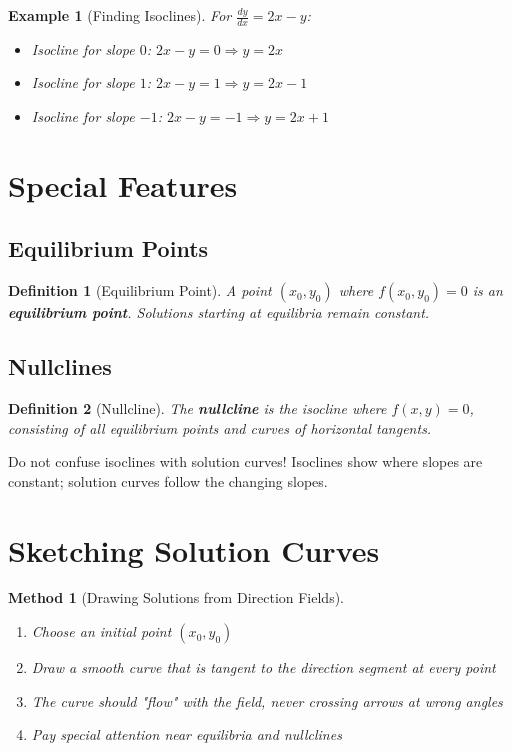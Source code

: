 \documentclass[12pt]{article}
\newtheorem{definition}{Definition}
\newtheorem{method}{Method}
\newtheorem{example}{Example}
\begin{document}
\begin{example}[Finding Isoclines]
For $\frac{dy}{dx} = 2x - y$:
\begin{itemize}
    \item Isocline for slope $0$: $2x - y = 0 \Rightarrow y = 2x$
    \item Isocline for slope $1$: $2x - y = 1 \Rightarrow y = 2x - 1$
    \item Isocline for slope $-1$: $2x - y = -1 \Rightarrow y = 2x + 1$
\end{itemize}
\end{example}

\section{Special Features}

\subsection{Equilibrium Points}

\begin{definition}[Equilibrium Point]
A point $(x_0, y_0)$ where $f(x_0, y_0) = 0$ is an \textbf{equilibrium point}. Solutions starting at equilibria remain constant.
\end{definition}

\subsection{Nullclines}

\begin{definition}[Nullcline]
The \textbf{nullcline} is the isocline where $f(x,y) = 0$, consisting of all equilibrium points and curves of horizontal tangents.
\end{definition}

\begin{warning}
Do not confuse isoclines with solution curves! Isoclines show where slopes are constant; solution curves follow the changing slopes.
\end{warning}

\section{Sketching Solution Curves}

\begin{method}[Drawing Solutions from Direction Fields]
\begin{enumerate}
    \item Choose an initial point $(x_0, y_0)$
    \item Draw a smooth curve that is tangent to the direction segment at every point
    \item The curve should "flow" with the field, never crossing arrows at wrong angles
    \item Pay special attention near equilibria and nullclines
\end{enumerate}
\end{method}
\end{document}
